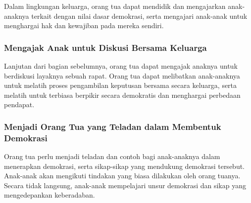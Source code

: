 Dalam lingkungan keluarga, orang tua dapat mendidik dan mengajarkan anak-anaknya terkait dengan nilai dasar demokrasi, serta mengajari anak-anak untuk menghargai hak dan kewajiban pada mereka sendiri.

\subsubsection{Mengajak Anak untuk Diskusi Bersama Keluarga}

Lanjutan dari bagian sebelumnya, orang tua dapat mengajak anaknya untuk berdiskusi layaknya sebuah rapat. Orang tua dapat melibatkan anak-anaknya untuk melatih proses pengambilan keputusan bersama secara keluarga, serta melatih untuk terbiasa berpikir secara demokratis dan menghargai perbedaan pendapat.

\subsubsection{Menjadi Orang Tua yang Teladan dalam Membentuk Demokrasi}

Orang tua perlu menjadi teladan dan contoh bagi anak-anaknya dalam menerapkan demokrasi, serta sikap-sikap yang mendukung demokrasi tersebut. Anak-anak akan mengikuti tindakan yang biasa dilakukan oleh orang tuanya. Secara tidak langsung, anak-anak mempelajari unsur demokrasi dan sikap yang mengedepankan keberadaban.